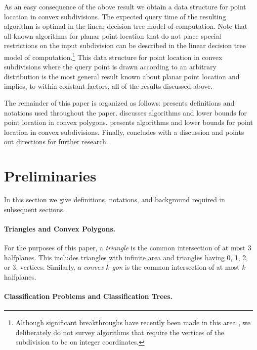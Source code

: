 \documentclass[charterfonts,lotsofwhite]{patmorin}
\begin{document}
As an easy consequence of the above result we obtain a data structure
for point location in convex subdivisions.  The expected query time of
the resulting algorithm is optimal in the linear decision tree model
of computation. Note that all known algorithms for planar point
location that do not place special restrictions on the input
subdivision can be described in the linear decision tree model of
computation.\footnote{Although significant breakthroughs have recently been
made in this area \cite{c06,p06}, we deliberately do not survey algorithms
that require the vertices of the subdivision to be on integer
coordinates.}  This data structure for point location in convex
subdivisions where the query point is drawn according to an arbitrary
distribution is the most general result known about planar point
location and implies, to within constant factors, all of the results
discussed above.

The remainder of this paper is organized as follows:  
presents definitions and notations used throughout the paper.
 discusses algorithms and lower bounds for point
location in convex polygons.   presents algorithms
and lower bounds for point location in convex subdivisions.  Finally,
 concludes with a discussion and points out
directions for further research.


\section{Preliminaries}

In this section we give definitions, notations, and background
required in subsequent sections.

\paragraph{Triangles and Convex Polygons.}  For the purposes of this paper, a
\emph{triangle} is the common intersection of at most 3 halfplanes.
This includes triangles with infinite area and triangles having 0, 1,
2, or 3, vertices. Similarly, a \emph{convex $k$-gon} is the common
intersection of at most $k$ halfplanes.

\paragraph{Classification Problems and Classification Trees.}
\end{document}
